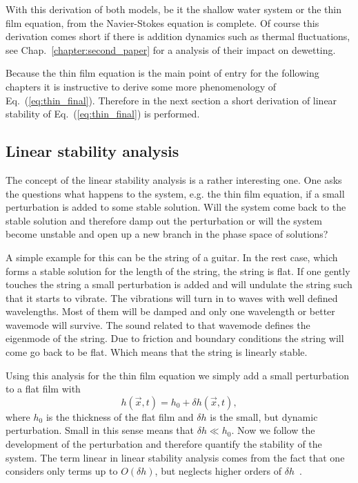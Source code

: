 With this derivation of both models, be it the shallow water system or the thin film equation, from the Navier-Stokes equation is complete.
Of course this derivation comes short if there is addition dynamics such as thermal fluctuations, see Chap.~\ref{chapter:second_paper} for a analysis of their impact on dewetting.

Because the thin film equation is the main point of entry for the following chapters it is instructive to derive some more phenomenology of Eq.~(\ref{eq:thin_final}).
Therefore in the next section a short derivation of linear stability of Eq.~(\ref{eq:thin_final}) is performed.

\subsection{Linear stability analysis}
\label{susbsec:Lin_stab}
The concept of the linear stability analysis is a rather interesting one.
One asks the questions what happens to the system, e.g. the thin film equation, if a small perturbation is added to some stable solution.
Will the system come back to the stable solution and therefore damp out the perturbation or will the system become unstable and open up a new branch in the phase space of solutions?

A simple example for this can be the string of a guitar.
In the rest case, which forms a stable solution for the length of the string, the string is flat.
If one gently touches the string a small perturbation is added and will undulate the string such that it starts to vibrate.
The vibrations will turn in to waves with well defined wavelengths. 
Most of them will be damped and only one wavelength or better wavemode will survive.
The sound related to that wavemode defines the eigenmode of the string.
Due to friction and boundary conditions the string will come go back to be flat.
Which means that the string is linearly stable.

Using this analysis for the thin film equation we simply add a small perturbation to a flat film with
\begin{equation}\label{eq:lin_stab_delta}
    h(\vec{x},t) = h_0 + \delta h(\vec{x},t),
\end{equation}
where $h_0$ is the thickness of the flat film and $\delta h$ is the small, but dynamic perturbation.
Small in this sense means that $\delta h \ll h_0$.
Now we follow the development of the perturbation and therefore quantify the stability of the system.
The term linear in linear stability analysis comes from the fact that one considers only terms up to $O(\delta h)$, but neglects higher orders of $\delta h$~\cite{laugesen2000linear}.


